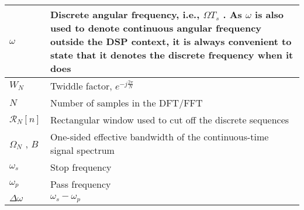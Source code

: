 \begin{xltabular}{\textwidth}{XX}
	\(\omega\)                                                                                      & Discrete angular frequency, i.e., \(\Omega T_s\) \cite[eq (3.27)]{ingleDigitalSignalProcessing2000}. As \(\omega\) is also used to denote continuous angular frequency outside the DSP context, it is always convenient to state that it denotes the discrete frequency when it does \\ \hline
	\(W_N\)                                                                                         & Twiddle factor, \(e^{-j\frac{2\pi}{N}}\) \cite{ingleDigitalSignalProcessing2000}                                                                                                                            \\ \hline
	\(N\)                                                                                           & Number of samples in the DFT/FFT                                                                                                                                                                            \\ \hline
	\(\mathcal{R}_N [n]\)                                                                           & Rectangular window used to cut off the discrete sequences \cite{ingleDigitalSignalProcessing2000}                                                                                                           \\ \hline
	\(\Omega_N\) \cite{oppenheimDiscreteTimeSignalProcessing2009}, \(B\)                            & One-sided effective bandwidth of the continuous-time signal spectrum                                                                                                                                        \\ \hline
	\(\omega_s\) \cite{ingleDigitalSignalProcessing2000}                                                                                    & Stop frequency                                                                                                                                                       \\ \hline
	\(\omega_p\) \cite{ingleDigitalSignalProcessing2000}                                                                                    & Pass frequency                                                                                                                                                      \\ \hline
	\(\Delta \omega\) \cite{ingleDigitalSignalProcessing2000}                                                                               & \(\omega_s - \omega_p\)                                                                                                                                             \\ \hline

\end{xltabular}

